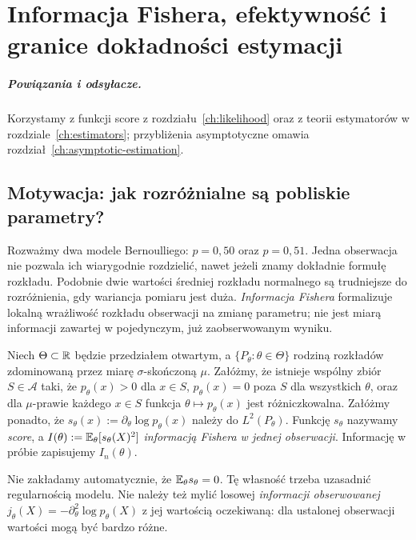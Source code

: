 \chapter{Informacja Fishera, efektywność i granice dokładności estymacji}
\label{ch:fisher-information}
\paragraph{Powiązania i odsyłacze.} Korzystamy z funkcji score z rozdziału~\ref{ch:likelihood} oraz z teorii estymatorów w rozdziale~\ref{ch:estimators}; przybliżenia asymptotyczne omawia rozdział~\ref{ch:asymptotic-estimation}.


\section{Motywacja: jak rozróżnialne są pobliskie parametry?}
Rozważmy dwa modele Bernoulliego: $p=0{,}50$ oraz $p=0{,}51$.
Jedna obserwacja nie pozwala ich wiarygodnie rozdzielić, nawet jeżeli
znamy dokładnie formułę rozkładu. Podobnie dwie wartości średniej
rozkładu normalnego są trudniejsze do rozróżnienia, gdy wariancja
pomiaru jest duża. \emph{Informacja Fishera} formalizuje lokalną
wrażliwość rozkładu obserwacji na zmianę parametru; nie jest miarą
informacji zawartej w pojedynczym, już zaobserwowanym wyniku.

\begin{definicja}\label{def:fisher-score}
Niech $\Theta\subset\mathbb R$ będzie przedziałem otwartym, a
$\{P_\theta:\theta\in\Theta\}$ rodziną rozkładów zdominowaną
przez miarę $\sigma$-skończoną $\mu$. Załóżmy, że istnieje wspólny zbiór $S\in\mathcal A$
taki, że $p_\theta(x)>0$ dla $x\in S$, $p_\theta(x)=0$
poza $S$ dla wszystkich $\theta$, oraz dla $\mu$-prawie
każdego $x\in S$ funkcja $\theta\mapsto p_\theta(x)$
jest różniczkowalna. Załóżmy ponadto, że
$s_\theta(x):=\partial_\theta\log p_\theta(x)$ należy do
$L^2(P_\theta)$. Funkcję $s_\theta$ nazywamy \emph{score}, a
$I(\theta):=\mathbb E_\theta[s_\theta(X)^2]$ \emph{informacją Fishera
w jednej obserwacji}. Informację w próbie zapisujemy $I_n(\theta)$.
\end{definicja}

Nie zakładamy automatycznie, że $\mathbb E_\theta s_\theta=0$.
Tę własność trzeba uzasadnić regularnością modelu. Nie należy też
mylić losowej \emph{informacji obserwowanej}
$j_\theta(X)=-\partial_\theta^2\log p_\theta(X)$ z jej
wartością oczekiwaną: dla ustalonej obserwacji wartości mogą być
bardzo różne.

